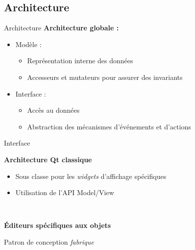 \documentclass[11pt]{beamer}
\begin{document}
\subsection{Architecture}

\begin{frame}{Architecture}
\textbf{Architecture globale :}
\begin{itemize}
\item Modèle :
\begin{itemize}
\item Représentation interne des données
\item Accesseurs et mutateurs pour assurer des invariants
\end{itemize}
\item Interface :
\begin{itemize}
\item Accès au données
\item Abstraction des mécanismes d'événements et d'actions
\end{itemize}
\end{itemize}

\end{frame}

\begin{frame}{Interface}

\textbf{Architecture Qt classique}
\begin{itemize}
\item Sous classe pour les \textit{widgets} d'affichage spécifiques
\item Utilisation de l'API Model/View
\end{itemize}

~

\textbf{Éditeurs spécifiques aux objets}

Patron de conception \textit{fabrique}

\end{frame}
\end{document}
